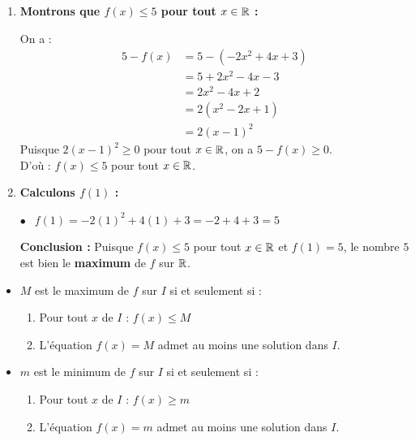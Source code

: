 \documentclass[10pt, a4paper]{article}
\begin{document}
\begin{Solution}[APPLICATION][14]
\begin{enumerate}[leftmargin=*,itemsep=0.5pt]
    \item \textbf{Montrons que $f(x) \leq 5$ pour tout $x \in \mathbb{R}$ :}

    On a :
    \begin{align*}
        5 - f(x) &= 5 - (-2x^2 + 4x + 3) \\
                 &= 5 + 2x^2 - 4x - 3 \\
                 &= 2x^2 - 4x + 2 \\
                 &= 2(x^2 - 2x + 1) \\
                 &= 2(x - 1)^2
    \end{align*}
    Puisque $2(x-1)^2 \geq 0$ pour tout $x \in \mathbb{R}$, on a $5 - f(x) \geq 0$. \\
    D'où : \quad $f(x) \leq 5$ pour tout $x \in \mathbb{R}$.

    \item \textbf{Calculons $f(1)$ :}

     $\bullet~~$ $f(1) = -2(1)^2 + 4(1) + 3 = -2 + 4 + 3 = 5$ 

    \textbf{Conclusion :}
    Puisque $f(x) \leq 5$ pour tout $x \in \mathbb{R}$ et $f(1) = 5$, le nombre $5$ est bien le \textbf{maximum} de $f$ sur $\mathbb{R}$.
\end{enumerate}
\end{Solution}


\begin{Remarque}
\begin{itemize}[leftmargin=*,itemsep=0.5pt]
    \item $M$ est le maximum de $f$ sur $I$ si et seulement si :
    \begin{enumerate}[leftmargin=*,itemsep=0.5pt]
        \item Pour tout $x$ de $I$ : $f(x) \leq M$
        \item L'équation $f(x) = M$ admet au moins une solution dans $I$.
    \end{enumerate}
    \item $m$ est le minimum de $f$ sur $I$ si et seulement si :
    \begin{enumerate}[leftmargin=*,itemsep=1pt]
        \item Pour tout $x$ de $I$ : $f(x) \geq m$
        \item L'équation $f(x) = m$ admet au moins une solution dans $I$.
    \end{enumerate}
\end{itemize}
\end{Remarque}
\end{document}
